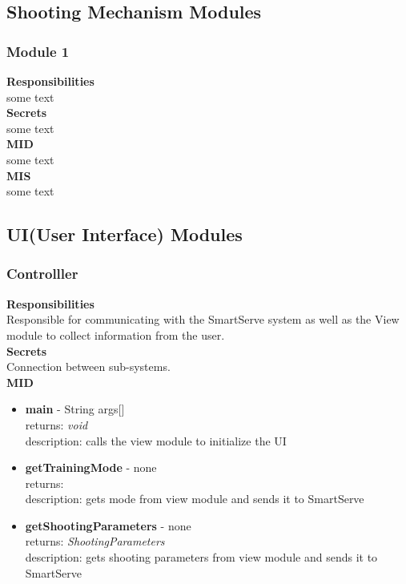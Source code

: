 \documentclass[11pt]{article}
\begin{document}
\subsection{Shooting Mechanism Modules}
\subsubsection*{Module 1}
\textbf{Responsibilities} \\
some text \\
\textbf{Secrets} \\ 
some text \\ 
\textbf{MID} \\
some text \\
\textbf{MIS} \\
some text \\
\subsection{UI(User Interface) Modules}
\subsubsection*{Controlller}
\textbf{Responsibilities} \\
Responsible for communicating with the SmartServe system as well as the View module to collect information from the user. \\
\textbf{Secrets} \\ 
Connection between sub-systems. \\ 
\textbf{MID} \\
\begin{itemize}
\item \textbf{main} - String args[] \\ returns: \textit{void} \\ description: calls the view module to initialize the UI
\item \textbf{getTrainingMode} - none \\ returns:  \\ description: gets mode from view module and sends it to SmartServe
\item \textbf{getShootingParameters} - none \\ returns: \textit{ShootingParameters} \\ description: gets shooting parameters from view module and sends it to SmartServe
\end{itemize}
\end{document}
